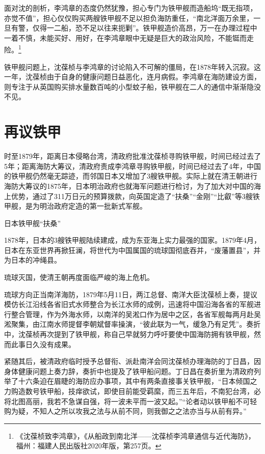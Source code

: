 \documentclass[12pt,UTF8]{ctexbook}
\begin{document}
面对沈的剖析，李鸿章的态度仍然犹豫，担心专门为铁甲舰而造船坞“既无指项，亦觉不值”，担心仅仅购买两艘铁甲舰不足以担负海防重任，“南北洋面万余里，一旦有警，仅得一二船，恐不足以往来扼剿”。铁甲舰造价高昂，万一在办理过程中一着不慎，未能买好、用好，在李鸿章眼中无疑是巨大的政治风险，不能铤而走险。\footnote{《沈葆桢致李鸿章》，《从船政到南北洋——沈葆桢李鸿章通信与近代海防》，福州：福建人民出版社2020年版，第257页。}

铁甲舰问题上，沈葆桢与李鸿章的讨论陷入不可解的僵局，在1878年转入沉寂。这一年，沈葆桢由于自身的健康问题日益恶化，连月病假。李鸿章在海防建设方面，则专注于从英国购买排水量数百吨的小型蚊子船，铁甲舰在二人的通信中渐渐隐没不见。

\section{再议铁甲}

时至1879年，距离日本侵略台湾，清政府批准沈葆桢寻购铁甲舰，时间已经过去了5年；距离海防大筹议，清政府责成李鸿章寻购铁甲舰，时间已经过去了4年，中国的铁甲舰仍然毫无踪迹，而邻国日本又增加了3艘铁甲舰。实际上就在清王朝进行海防大筹议的1875年，日本明治政府也就海军问题进行检讨，为了加大对中国的海上优势，通过了311万日元的预算拨款，向英国定造了“扶桑”“金刚”“比叡”等3艘铁甲舰，是为明治政府定造的第一批新式军舰。

日本铁甲舰“扶桑”

1878年，日本的3艘铁甲舰陆续建成，成为东亚海上实力最强的国家。1879年4月，日本在东亚世界再掀狂澜，将世代为中国属国的琉球国彻底吞并，“废藩置县”，并为日本的冲绳县。

琉球灭国，使清王朝再度面临严峻的海上危机。

琉球方向正当南洋海防，1879年5月11日，两江总督、南洋大臣沈葆桢上奏，提议模仿长江沿线各省旧式水师整合为长江水师的成例，迅速将中国沿海各省的军舰进行整合管理，作为外海水师，以南洋的吴淞口作为居中之区，各省军舰每两月赴吴淞聚集，由江南水师提督李朝斌督率操演，“彼此联为一气，缓急乃有足凭”。奏折中，沈葆桢再次提到了铁甲舰，称自己早就努力呼吁要使中国海防拥有铁甲舰，然而此事日久没有成果。

紧随其后，被清政府临时授予总督衔、派赴南洋会同沈葆桢办理海防的丁日昌，因身体健康问题上奏力辞，奏折中也提及了铁甲船问题。丁日昌在奏折里为清政府列举了十六条迫在眉睫的海防应办事项，其中有两条直接事关铁甲舰，“日本倾国之力购造数号铁甲船，技痒欲试，即使目前能受羁縻，而三五年后，不南犯台湾，必将北图高丽，我若不急谋自强，将一波未平而一波又起。”“论者动以铁甲船不可轻购为疑，不知人之所以攻我之法与从前不同，则我御之之法亦当与从前有异。”
\end{document}
